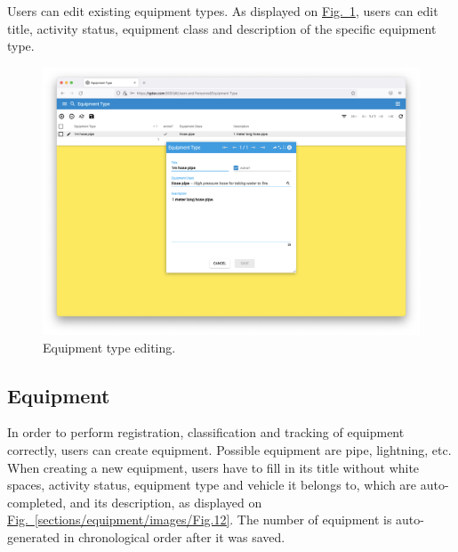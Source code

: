 \newpage
Users can edit existing equipment types. As displayed on \hyperref[sections/equipment/images/Fig.11]{Fig.~\ref*{sections/equipment/images/Fig.11}}, users can edit title, activity status, equipment class and description of the specific equipment type.

    \begin{figure}[!htbp]
	\centering
	\includegraphics[width=0.95\linewidth]{sections/equipment/images/Fig.11.png}
	\caption{Equipment type editing.}\label{sections/equipment/images/Fig.11}
	\end{figure}
	
\newpage	
\subsection{Equipment}

In order to perform registration, classification and tracking of equipment correctly, users can create equipment. Possible equipment are pipe, lightning, etc. When creating a new equipment, users have to fill in its title without white spaces, activity status, equipment type and vehicle it belongs to, which are auto-completed, and its description, as displayed on \hyperref[sections/equipment/images/Fig.12]{Fig.~\ref*{sections/equipment/images/Fig.12}}. The number of equipment is auto-generated in chronological order after it was saved. 

